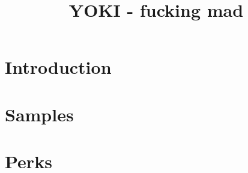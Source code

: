 \documentclass[10pt,a4paper]{article}
\author{}
\title{YOKI - fucking mad}
\date{}
\begin{document}
	\maketitle
	\pagebreak
	\setcounter{tocdepth}{3}
	\tableofcontents
	\pagebreak
	\part{Introduction}

	\printindex
	
	
	
	\pagebreak
	\part{Samples}
	

	\pagebreak
	\part{Perks}
	
	
\end{document}
